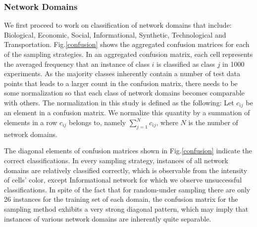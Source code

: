 \documentclass{article}
\begin{document}
 
\subsubsection{Network Domains} 
We first proceed to work on classification of network domains that include: Biological, Economic, Social, Informational, Synthetic, Technological and Transportation. Fig.\ref{confusion} shows the aggregated confusion matrices for each of the sampling strategies. In an aggregated confusion matrix, each cell represents the averaged frequency that an instance of class $i$ is classified as class $j$ in 1000 experiments. As the majority classes inherently contain a number of test data points that leads to a larger count in the confusion matrix, there needs to be some normalization so that each class of network domains becomes comparable with others. The normalization in this study is defined as the following: Let $c_{ij}$ be an element in a confusion matrix. We normalize this quantity by a summation of elements in a row $c_{ij}$ belongs to, namely $\sum_{j=1}^N c_{ij}$, where $N$ is the number of network domains. 

The diagonal elements of confusion matrices shown in Fig.\ref{confusion} indicate the correct classifications. In every sampling strategy, instances of all network domains are relatively classified correctly, which is observable from the intensity of cells' color, except Informational network for which we observe unsuccessful classifications. In spite of the fact that for random-under sampling there are only 26 instances for the training set of each domain, the confusion matrix for the sampling method exhibits a very strong diagonal pattern, which may imply that instances of various network domains are inherently quite separable.
\end{document}
